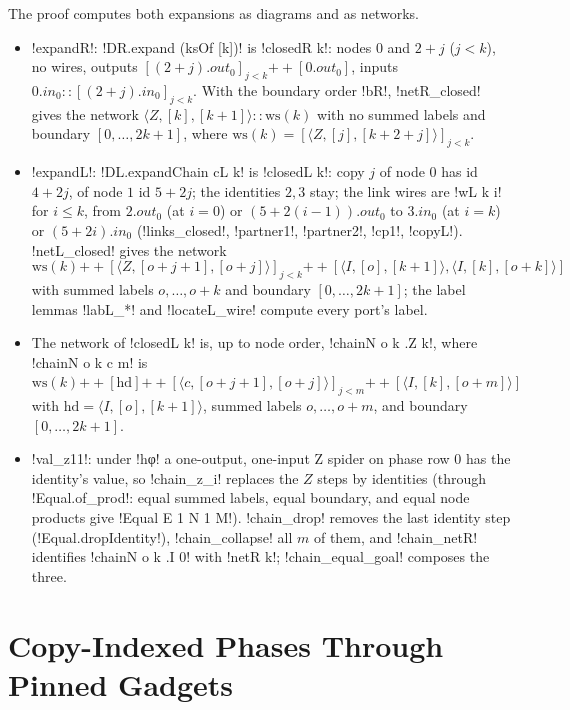 {\noindent The proof computes both expansions as diagrams and as networks.
\begin{itemize}
\item \lbx!expandR!: \lbx!DR.expand (ksOf [k])! is \lbx!closedR k!: nodes $0$ and $2+j$ ($j<k$), no wires, outputs $[(2+j).\mathit{out}_0]_{j<k}\mathbin{+\!\!+}[0.\mathit{out}_0]$, inputs $0.\mathit{in}_0\mathbin{::}[(2+j).\mathit{in}_0]_{j<k}$. With the boundary order \lbx!bR!, \lbx!netR_closed! gives the network $\langle Z,[k],[k{+}1]\rangle\mathbin{::}\mathrm{ws}(k)$ with no summed labels and boundary $[0,\ldots,2k+1]$, where $\mathrm{ws}(k)=[\langle Z,[j],[k+2+j]\rangle]_{j<k}$.
\item \lbx!expandL!: \lbx!DL.expandChain cL k! is \lbx!closedL k!: copy $j$ of node $0$ has id $4+2j$, of node $1$ id $5+2j$; the identities $2,3$ stay; the link wires are \lbx!wL k i! for $i\le k$, from $2.\mathit{out}_0$ (at $i=0$) or $(5+2(i-1)).\mathit{out}_0$ to $3.\mathit{in}_0$ (at $i=k$) or $(5+2i).\mathit{in}_0$ (\lbx!links_closed!, \lbx!partner1!, \lbx!partner2!, \lbx!cp1!, \lbx!copyL!). \lbx!netL_closed! gives the network
\[
\mathrm{ws}(k)\mathbin{+\!\!+}[\langle Z,[o+j+1],[o+j]\rangle]_{j<k}\mathbin{+\!\!+}[\langle I,[o],[k+1]\rangle,\langle I,[k],[o+k]\rangle]
\]
with summed labels $o,\ldots,o+k$ and boundary $[0,\ldots,2k+1]$; the label lemmas \lbx!labL_*! and \lbx!locateL_wire! compute every port's label.
\item The network of \lbx!closedL k! is, up to node order, \lbx!chainN o k .Z k!, where \lbx!chainN o k c m! is $\mathrm{ws}(k)\mathbin{+\!\!+}[\mathrm{hd}]\mathbin{+\!\!+}[\langle c,[o+j+1],[o+j]\rangle]_{j<m}\mathbin{+\!\!+}[\langle I,[k],[o+m]\rangle]$ with $\mathrm{hd}=\langle I,[o],[k+1]\rangle$, summed labels $o,\ldots,o+m$, and boundary $[0,\ldots,2k+1]$.
\item \lbx!val_z11!: under \lbx!hφ! a one-output, one-input Z spider on phase row $0$ has the identity's value, so \lbx!chain_z_i! replaces the $Z$ steps by identities (through \lbx!Equal.of_prod!: equal summed labels, equal boundary, and equal node products give \lbx!Equal E 1 N 1 M!). \lbx!chain_drop! removes the last identity step (\lbx!Equal.dropIdentity!), \lbx!chain_collapse! all $m$ of them, and \lbx!chain_netR! identifies \lbx!chainN o k .I 0! with \lbx!netR k!; \lbx!chain_equal_goal! composes the three.
\end{itemize}

\section{Copy-Indexed Phases Through Pinned Gadgets}\label{sec:boxes-copyphase}

}
